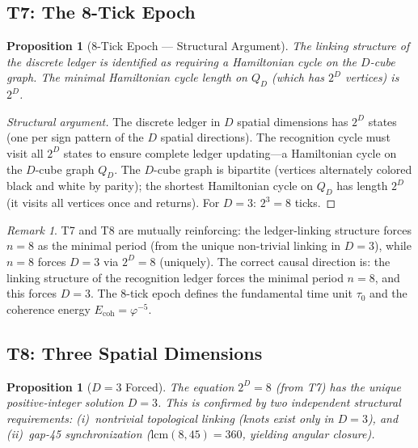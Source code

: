 \documentclass[12pt,a4paper]{article}
\newtheorem{proposition}[theorem]{Proposition}
\theoremstyle{definition}
\theoremstyle{remark}
\newtheorem{remark}[theorem]{Remark}
\begin{document}
\subsection{T7: The 8-Tick Epoch}

\begin{proposition}[8-Tick Epoch --- Structural Argument]
The linking structure of the discrete ledger is identified as requiring
a Hamiltonian cycle on the $D$-cube graph.  The minimal Hamiltonian
cycle length on $Q_D$ (which has $2^D$ vertices) is $2^D$.
\end{proposition}

\begin{proof}[Structural argument]
The discrete ledger in $D$ spatial dimensions has $2^D$ states
(one per sign pattern of the $D$ spatial directions).  The
recognition cycle must visit all $2^D$ states to ensure complete
ledger updating---a Hamiltonian cycle on the $D$-cube graph
$Q_D$.  The $D$-cube graph is bipartite (vertices alternately
colored black and white by parity); the shortest Hamiltonian cycle
on $Q_D$ has length $2^D$ (it visits all vertices once and returns).
For $D = 3$: $2^3 = 8$ ticks.
\end{proof}

\begin{remark}
T7 and T8 are mutually reinforcing: the ledger-linking structure forces
$n = 8$ as the minimal period (from the unique non-trivial linking in
$D = 3$), while $n = 8$ forces $D = 3$ via $2^D = 8$ (uniquely).
The correct causal direction is: the linking structure of the
recognition ledger forces the minimal period $n = 8$, and this forces
$D = 3$.  The 8-tick epoch defines the fundamental time unit $\tau_0$
and the coherence energy $E_{\mathrm{coh}} = \varphi^{-5}$.
\end{remark}

\subsection{T8: Three Spatial Dimensions}

\begin{proposition}[$D = 3$ Forced]
The equation $2^D = 8$ (from T7) has the unique positive-integer
solution $D = 3$.  This is confirmed by two independent structural
requirements: (i)~nontrivial topological linking (knots exist only in
$D = 3$), and (ii)~gap-45 synchronization
($\mathrm{lcm}(8, 45) = 360$, yielding angular closure).
\end{proposition}
\end{document}
